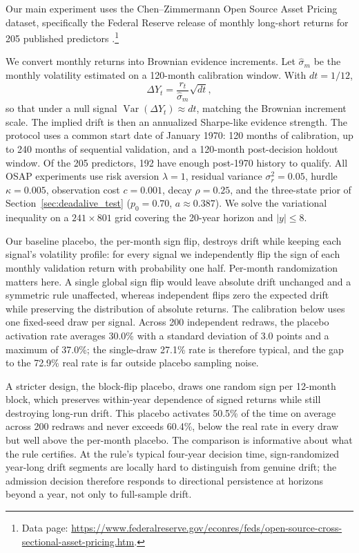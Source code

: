 \documentclass[11pt]{article}
\begin{document}
Our main experiment uses the Chen--Zimmermann Open Source Asset Pricing dataset,
specifically the Federal Reserve release of monthly long-short returns for 205
published predictors \citep{chenZimmermann2022}.\footnote{Data page:
\url{https://www.federalreserve.gov/econres/feds/open-source-cross-sectional-asset-pricing.htm}.}

We convert monthly returns into Brownian evidence increments.  Let
$\widehat\sigma_m$ be the monthly volatility estimated on a 120-month calibration
window.  With $dt=1/12$,
\begin{equation}
    \Delta Y_t=\frac{r_t}{\widehat\sigma_m}\sqrt{dt},
    \label{eq:evidence_increment}
\end{equation}
so that under a null signal $\operatorname{Var}(\Delta Y_t)\approx dt$, matching the
Brownian increment scale.  The implied drift is then an annualized Sharpe-like
evidence strength.  The protocol uses a common start date of January 1970: 120 months
of calibration, up to 240 months of sequential validation, and a 120-month
post-decision holdout window.  Of the 205 predictors, 192 have enough post-1970
history to qualify.  All OSAP experiments use risk aversion $\lambda=1$, residual
variance $\sigma_r^2=0.05$, hurdle $\kappa=0.005$, observation cost $c=0.001$, decay
$\rho=0.25$, and the three-state prior of Section~\ref{sec:deadalive_test}
($p_0=0.70$, $a\approx0.387$).  We solve the variational inequality on a
$241\times801$ grid covering the 20-year horizon and $|y|\le8$.

Our baseline placebo, the per-month sign flip, destroys drift while keeping each
signal's volatility profile: for every signal we independently flip the sign of each
monthly validation return with probability one half.  Per-month randomization matters
here.  A single global sign flip would leave absolute drift unchanged and a symmetric
rule unaffected, whereas independent flips zero the expected drift while preserving
the distribution of absolute returns.  The calibration below uses one fixed-seed draw per signal.  Across
200 independent redraws, the placebo activation rate averages 30.0\% with a standard
deviation of 3.0 points and a maximum of 37.0\%; the single-draw 27.1\% rate is
therefore typical, and the gap to the 72.9\% real rate is far outside placebo sampling
noise.

A stricter design, the block-flip placebo, draws one random sign per 12-month block,
which preserves within-year dependence of signed returns while still destroying
long-run drift.  This placebo activates 50.5\% of the time on average across 200
redraws and never exceeds 60.4\%, below the real rate in every draw but well above the
per-month placebo.  The comparison is informative about what the rule certifies.  At
the rule's typical four-year decision time, sign-randomized year-long drift segments
are locally hard to distinguish from genuine drift; the admission decision therefore
responds to directional persistence at horizons beyond a year, not only to full-sample
drift.
\end{document}

